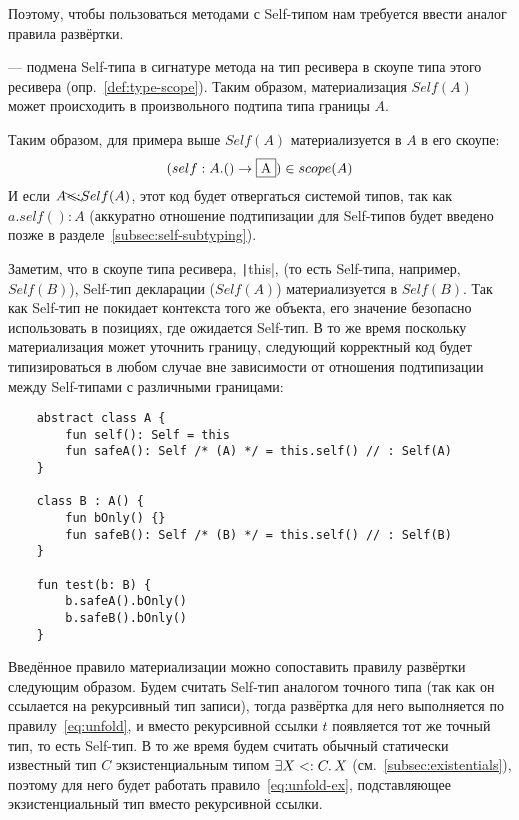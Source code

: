Поэтому, чтобы пользоваться методами с Self-типом нам требуется ввести аналог правила развёртки.

\begin{definition}
    \label{def:materialization}
     --- подмена Self-типа в сигнатуре метода на тип ресивера в скоупе типа этого ресивера (опр.~\ref{def:type-scope}).
    Таким образом, материализация $Self(A)$ может происходить в произвольного подтипа типа границы $A$.
\end{definition}

Таким образом, для примера выше $Self(A)$ материализуется в $A$ в его скоупе:
\[(self: A.() \to \framebox{A}) \in scope(A)\]
И если $A \bcancel{<:} Self(A)$, этот код будет отвергаться системой типов, так как $a.self() : A$ (аккуратно отношение подтипизации для Self-типов будет введено позже в разделе~\ref{subsec:self-subtyping}).

Заметим, что в скоупе типа ресивера, \texttt|this|, (то есть Self-типа, например, $Self(B)$), Self-тип декларации ($Self(A)$) материализуется в $Self(B)$.
Так как Self-тип не покидает контекста того же объекта, его значение безопасно использовать в позициях, где ожидается Self-тип.
В то же время поскольку материализация может уточнить границу, следующий корректный код будет типизироваться в любом случае вне зависимости от отношения подтипизации между Self-типами с различными границами:

\begin{verbatim}
    abstract class A {
        fun self(): Self = this
        fun safeA(): Self /* (A) */ = this.self() // : Self(A)
    }

    class B : A() {
        fun bOnly() {}
        fun safeB(): Self /* (B) */ = this.self() // : Self(B)
    }

    fun test(b: B) {
        b.safeA().bOnly()
        b.safeB().bOnly()
    }
\end{verbatim}

Введённое правило материализации можно сопоставить правилу развёртки следующим образом.
Будем считать Self-тип аналогом точного типа (так как он ссылается на рекурсивный тип записи), тогда развёртка для него выполняется по правилу~\eqref{eq:unfold}, и вместо рекурсивной ссылки $t$ появляется тот же точный тип, то есть Self-тип.
В то же время будем считать обычный статически известный тип $C$ экзистенциальным типом $\exists X <: C \ldotp X$ (см.~\ref{subsec:existentials}), поэтому для него будет работать правило~\eqref{eq:unfold-ex}, подставляющее экзистенциальный тип вместо рекурсивной ссылки.

